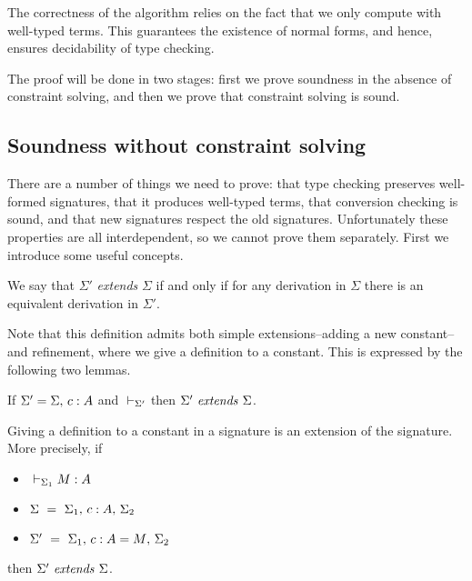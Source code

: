 
The correctness of the algorithm relies on the fact that we only compute with
well-typed terms.  This guarantees the existence of normal forms, and hence,
ensures decidability of type checking.

The proof will be done in two stages: first we prove soundness in the absence
of constraint solving, and then we prove that constraint solving
is sound.

\subsection{Soundness without constraint solving}

There are a number of things we need to prove: that type checking preserves
well-formed signatures, that it produces well-typed terms, that conversion
checking is sound, and that new signatures respect the old signatures.
Unfortunately these properties are all interdependent, so we cannot prove them
separately. First we introduce some useful concepts.

\begin{definition} \label{defSigExt}
    We say that $\Sigma'$ {\em extends} $\Sigma$ if and only if for any {\Core}
    derivation in $\Sigma$ there is an equivalent derivation in $\Sigma'$.
\end{definition}

Note that this definition admits both simple extensions--adding a new
constant--and refinement, where we give a definition to a constant. This is
expressed by the following two lemmas.

\begin{lemma} \label{lemWeakenSig}
    If $\Sigma' = {\Sigma},\,{} {c:A}$ and ${} \vdash_{\Sigma'}$ then ${\Sigma'} ~ \mathit{extends} ~ {\Sigma}$.
\end{lemma}

\begin{lemma} \label{lemRefineSig}
    Giving a definition to a constant in a signature is an extension of the
    signature.
\if {}
    More precisely, if
    \begin{itemize}
	\item ${} \vdash_{\Sigma_1} {M} : {A}$
	\item $\Sigma ~ = ~ {\Sigma_1},\,{} {{c} : {A}},\,{} \Sigma_2$
	\item $\Sigma' ~ = ~ {\Sigma_1},\,{} {{c} : {A} = {M}},\,{} \Sigma_2$
    \end{itemize}
    then ${\Sigma'} ~ \mathit{extends} ~ {\Sigma}$.
\fi
\end{lemma}

